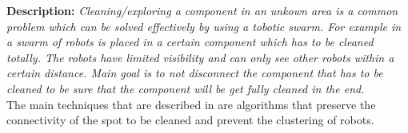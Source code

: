 
  \textbf{Description: }\emph{Cleaning/exploring a component in an unkown area is a common problem which can be solved effectively by using a tobotic swarm. For example in \cite{wagner2008cooperative} a swarm of robots is placed in a certain component which has to be cleaned totally. The robots have limited visibility and can only see other robots within a certain distance. Main goal is to not disconnect the component that has to be cleaned to be sure that the component will be get fully cleaned in the end.} \\
  The main techniques that are described in \cite{wagner2008cooperative} are algorithms that preserve the connectivity of the spot to be cleaned and prevent the clustering of robots.
